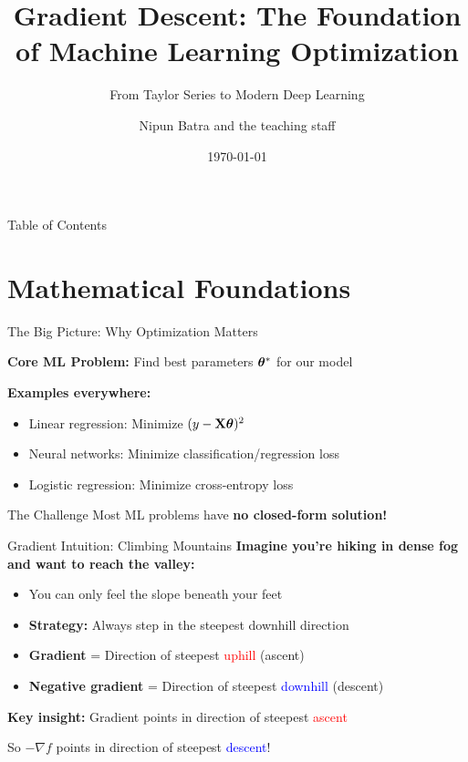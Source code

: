 \documentclass[usenames,dvipsnames]{beamer}
\title{Gradient Descent: The Foundation of Machine Learning Optimization}
\subtitle{From Taylor Series to Modern Deep Learning}
\date{\today}
\author{Nipun Batra and the teaching staff}
\institute{IIT Gandhinagar}
\begin{document}
  \maketitle

  \begin{frame}{Table of Contents}
    \tableofcontents
  \end{frame}

  \section{Mathematical Foundations}
  
  \begin{frame}{The Big Picture: Why Optimization Matters}
    \begin{keypointsbox}{}
    {\small \textbf{Core ML Problem:} Find best parameters $\boldsymbol{\theta}^*$ for our model}
    \end{keypointsbox}
    
    \pause
    \textbf{Examples everywhere:}
    \begin{itemize}[<+->]
        \item Linear regression: Minimize $(y - \mathbf{X}\boldsymbol{\theta})^2$
        \item Neural networks: Minimize classification/regression loss
        \item Logistic regression: Minimize cross-entropy loss
    \end{itemize}
    
    \pause
    \begin{alertbox}{The Challenge}
    {\small Most ML problems have \textbf{no closed-form solution!}}
    \end{alertbox}
  \end{frame}

  \begin{frame}{Gradient Intuition: Climbing Mountains}
    \textbf{Imagine you're hiking in dense fog and want to reach the valley:}
    
    \begin{itemize}[<+->]
        \item You can only feel the slope beneath your feet
        \item \textbf{Strategy:} Always step in the steepest downhill direction
        \item \textbf{Gradient} = Direction of steepest \textcolor{red}{uphill} (ascent)
        \item \textbf{Negative gradient} = Direction of steepest \textcolor{blue}{downhill} (descent)
    \end{itemize}
    
    \pause
    \begin{keypointsbox}{}
    \textbf{Key insight:} Gradient points in direction of steepest \textcolor{red}{ascent}
    
    So $-\nabla f$ points in direction of steepest \textcolor{blue}{descent}!
    \end{keypointsbox}
  \end{frame}
\end{document}
